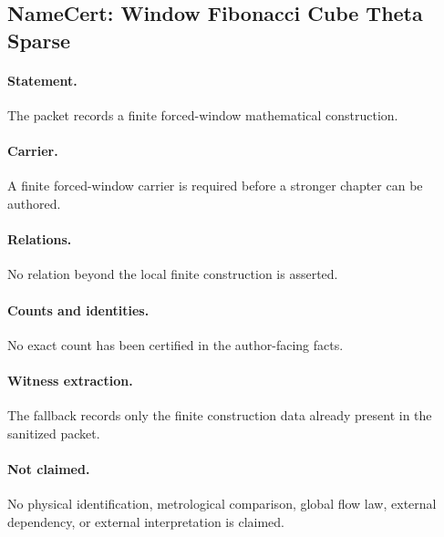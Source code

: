 \subsection{NameCert: Window Fibonacci Cube Theta Sparse}
\label{sec:namecert-window_fibonacci_cube_theta_sparse_certificate}

\paragraph{Statement.} The packet records a finite forced-window mathematical construction.

\paragraph{Carrier.} A finite forced-window carrier is required before a stronger chapter can be authored.

\paragraph{Relations.} No relation beyond the local finite construction is asserted.

\paragraph{Counts and identities.} No exact count has been certified in the author-facing facts.

\paragraph{Witness extraction.} The fallback records only the finite construction data already present in the sanitized packet.

\paragraph{Not claimed.} No physical identification, metrological comparison, global flow law, external dependency, or external interpretation is claimed.
